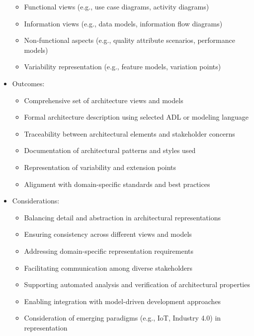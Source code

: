 \documentclass[12pt,a4paper]{article}
\begin{document}
\begin{itemize}
\begin{itemize}
        \item Functional views (e.g., use case diagrams, activity diagrams)
        \item Information views (e.g., data models, information flow diagrams)
        \item Non-functional aspects (e.g., quality attribute scenarios, performance models)
        \item Variability representation (e.g., feature models, variation points) \citep{Galster2014}
    \end{itemize}
    \item Outcomes:
    \begin{itemize}
        \item Comprehensive set of architecture views and models
        \item Formal architecture description using selected ADL or modeling language
        \item Traceability between architectural elements and stakeholder concerns
        \item Documentation of architectural patterns and styles used
        \item Representation of variability and extension points
        \item Alignment with domain-specific standards and best practices
    \end{itemize}
    \item Considerations:
    \begin{itemize}
        \item Balancing detail and abstraction in architectural representations \citep{Maier2009}
        \item Ensuring consistency across different views and models
        \item Addressing domain-specific representation requirements
        \item Facilitating communication among diverse stakeholders
        \item Supporting automated analysis and verification of architectural properties
        \item Enabling integration with model-driven development approaches \citep{Schmidt2006}
        \item Consideration of emerging paradigms (e.g., IoT, Industry 4.0) in representation \citep{Nakagawa2023}
    \end{itemize}
\end{itemize}
\end{document}
